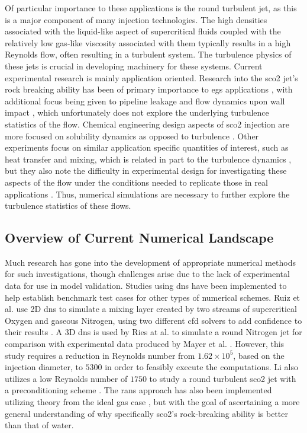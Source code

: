 Of particular importance to these applications is the round turbulent jet, as this is a major component of many injection technologies. The high densities associated with the liquid-like aspect of supercritical fluids coupled with the relatively low gas-like viscosity associated with them typically results in a high Reynolds flow, often resulting in a turbulent system. The turbulence physics of these jets is crucial in developing machinery for these systems. Current experimental research is mainly application oriented. Research into the \gls{sco2} jet's rock breaking ability has been of primary importance to \gls{egs} applications \cite{EGScomp, EGS2, very_rock, experiment, rb}, with additional focus being given to pipeline leakage and flow dynamics upon wall impact \cite{WANG2015210, WANG201977}, which unfortunately does not explore the underlying turbulence statistics of the flow. Chemical engineering design aspects of \gls{sco2} injection are more focused on solubility dynamics as opposed to turbulence \cite{freejet, pulse_jet}. Other experiments focus on similar application specific quantities of interest, such as heat transfer and mixing, which is related in part to the turbulence dynamics \cite{heated_cyl}, but they also note the difficulty in experimental design for investigating these aspects of the flow under the conditions needed to replicate those in real applications \cite{freejet}. Thus, numerical simulations are necessary to further explore the turbulence statistics of these flows.


\subsection{Overview of Current Numerical Landscape}
Much research has gone into the development of appropriate numerical methods for such investigations, though challenges arise due to the lack of experimental data for use in model validation. Studies using \gls{dns} have been implemented to help establish benchmark test cases for other types of numerical schemes. Ruiz et al. use 2D \gls{dns} to simulate a mixing layer created by two streams of supercritical Oxygen and gaseous Nitrogen, using two different \gls{cfd} solvers to add confidence to their results \cite{article}. A 3D \gls{dns} is used by Ries at al. to simulate a round Nitrogen jet for comparison with experimental data produced by Mayer et al. \cite{DNS_N}. However, this study requires a reduction in Reynolds number from $1.62 \times 10^5$, based on the injection diameter, to $5300$ in order to feasibly execute the computations. Li also utilizes a low Reynolds number of $1750$ to study a round turbulent \gls{sco2} jet with a preconditioning scheme \cite{Li2012}. The \gls{rans} approach has also been implemented utilizing theory from the ideal gas case \cite{RANS}, but with the goal of ascertaining a more general understanding of why specifically \gls{sco2}'s rock-breaking ability is better than that of water. 


